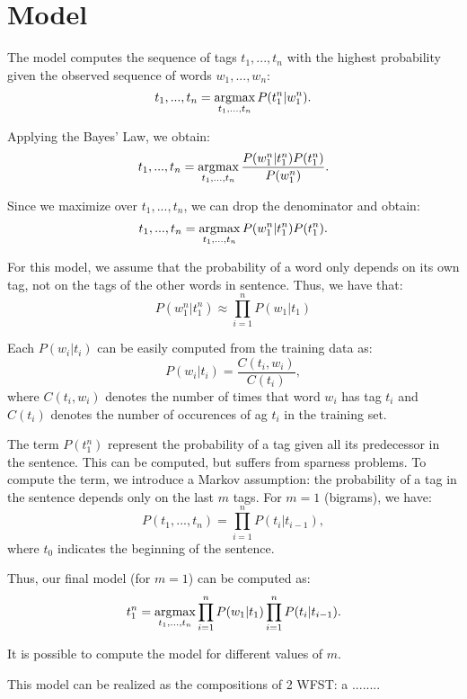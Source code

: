 \section{Model}
\label{sec:model}

The model computes the sequence of tags $t_1, ..., t_n$ with the highest probability given the observed sequence of words 
$w_1, ..., w_n$:
\begin{equation*}
    t_1, ..., t_n = \operatorname*{arg\!\max}_{t_1, ..., t_n} P(t_1^n | w_1^n).
\end{equation*}

Applying the Bayes' Law, we obtain:
\begin{equation*}
    t_1, ..., t_n = \operatorname*{arg\!\max}_{t_1, ..., t_n} \frac{P(w_1^n | t_1^n) P(t_1^n)}{P(w_1^n)}.
\end{equation*}

Since we maximize over $t_1, ..., t_n$, we can drop the denominator and obtain:
\begin{equation}
    t_1, ..., t_n = \operatorname*{arg\!\max}_{t_1, ..., t_n} P(w_1^n | t_1^n) P(t_1^n).
\end{equation}

For this model, we assume that the probability of a word only depends on its own tag,
not on the tags of the other words in sentence.
Thus, we have that:
\begin{equation}
    P(w_1^n | t_1^n) \approx \prod_{i=1}^n P(w_1 | t_1) 
\end{equation}

Each $P(w_i | t_i)$ can be easily computed from the training data as:
\begin{equation}
    P(w_i | t_i) = \frac{C(t_i, w_i)}{C(t_i)},
\end{equation}
where $C(t_i, w_i)$ denotes the number of times that word $w_i$ has tag $t_i$ 
and $C(t_i)$ denotes the number of occurences of  ag $t_i$ in the training set.

The term $P(t_1^n)$ represent the probability of a tag given all its predecessor in the sentence.
This can be computed, but suffers from sparness problems.
To compute the term, we introduce a Markov assumption: the probability of a tag in the sentence
depends only on the last $m$ tags.
For $m=1$ (bigrams), we have:
\begin{equation}
    P(t_1, ..., t_n) = \prod_{i=1}^n P(t_i | t_{i-1}),
\end{equation}
where $t_0$ indicates the beginning of the sentence.

Thus, our final model (for $m=1$) can be computed as:
\begin{equation}
    t_1^n = \operatorname*{arg\!\max}_{t_1, ..., t_n} \prod_{i=1}^n P(w_1 | t_1) \prod_{i=1}^n P(t_i | t_{i-1}).
\end{equation}

It is possible to compute the model for different values of $m$.


This model can be realized as the compositions of 2 \ac{WFST}:
a ........
